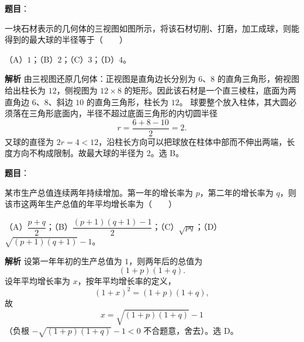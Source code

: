 \begin{answer}

\textbf{题目}：

一块石材表示的几何体的三视图如图所示，将该石材切削、打磨，加工成球，则能得到的最大球的半径等于\mbox{（　　）}
\nopagebreak[4]
\begin{center}\end{center}
\nopagebreak[4]
（A）$1$；（B）$2$；（C）$3$；（D）$4$。

\textbf{解析}
由三视图还原几何体：正视图是直角边长分别为 $6$、$8$ 的直角三角形，俯视图给出柱长为 $12$，侧视图为 $12\times8$ 的矩形。因此该石材是一个直三棱柱，底面为两直角边 $6$、$8$、斜边 $10$ 的直角三角形，柱长为 $12$。
球要整个放入柱体，其大圆必须落在三角形底面内，半径不超过底面三角形的内切圆半径
\nopagebreak[4]
\[r=\frac{6+8-10}2=2 .\]
又球的直径为 $2r=4<12$，沿柱长方向可以把球放在柱体中部而不伸出两端，长度方向不构成限制。故最大球的半径为 $2$。选 B。


\end{answer}
\begin{answer}

\textbf{题目}：

某市生产总值连续两年持续增加。第一年的增长率为 $p$，第二年的增长率为 $q$，则该市这两年生产总值的年平均增长率为\mbox{（　　）}

（A）$\dfrac{p+q}2$；（B）$\dfrac{(p+1)(q+1)-1}2$；（C）$\sqrt{pq}$；（D）$\sqrt{(p+1)(q+1)}-1$。

\textbf{解析}
设第一年年初的生产总值为 $1$，则两年后的总值为
\nopagebreak[4]
\[(1+p)(1+q).\]
设年平均增长率为 $x$，按年平均增长率的定义，
\nopagebreak[4]
\[(1+x)^2=(1+p)(1+q),\]
故
\nopagebreak[4]
\[x=\sqrt{(1+p)(1+q)}-1\]
（负根 $-\sqrt{(1+p)(1+q)}-1<0$ 不合题意，舍去）。选 D。


\end{answer}

